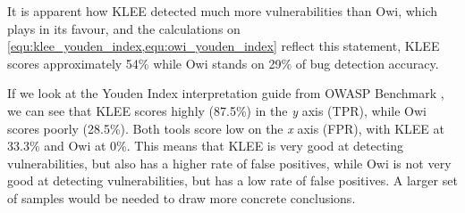 It is apparent how KLEE detected much more vulnerabilities than Owi, which plays in its favour, and the calculations on \cref{equ:klee_youden_index,equ:owi_youden_index} reflect this statement, KLEE scores approximately 54\% while Owi stands on 29\% of bug detection accuracy.

If we look at the Youden Index interpretation guide from OWASP Benchmark \cite{owasp_benchmark_scoring}, we can see that KLEE scores highly (87.5\%) in the \textit{y} axis (TPR), while Owi scores poorly (28.5\%). Both tools score low on the \textit{x} axis (FPR), with KLEE at 33.3\% and Owi at 0\%. This means that KLEE is very good at detecting vulnerabilities, but also has a higher rate of false positives, while Owi is not very good at detecting vulnerabilities, but has a low rate of false positives. A larger set of samples would be needed to draw more concrete conclusions.

